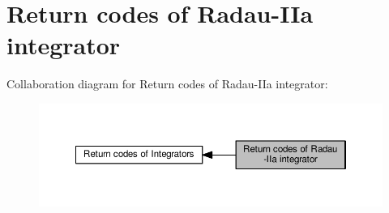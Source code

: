 \hypertarget{group__RK__ErrCodes}{}\section{Return codes of Radau-\/\+I\+Ia integrator}
\label{group__RK__ErrCodes}
Collaboration diagram for Return codes of Radau-\/\+I\+Ia integrator\+:\nopagebreak
\begin{figure}[H]
\begin{center}
\leavevmode
\includegraphics[width=350pt]{group__RK__ErrCodes}
\end{center}
\end{figure}
